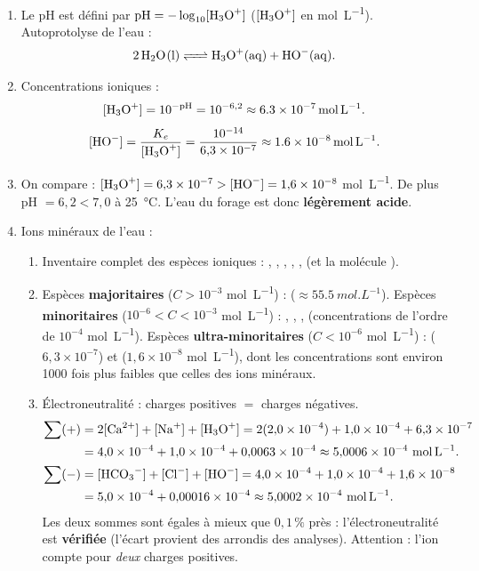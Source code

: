 \documentclass[11pt]{article}
\begin{document}
\begin{corrige}
\begin{enumerate}
\item Le pH est défini par $\mathrm{pH} = -\log_{10}[\ce{H3O+}]$ ($[\ce{H3O+}]$ en \si{mol.L^{-1}}). Autoprotolyse de l'eau :
\[ \ce{2 H2O(l) <=> H3O+(aq) + HO-(aq)}. \]
\item Concentrations ioniques :
\[ [\ce{H3O+}] = 10^{-\mathrm{pH}} = 10^{-6{,}2} \approx \SI{6,3e-7}{mol.L^{-1}}. \]
\[ [\ce{HO-}] = \frac{K_e}{[\ce{H3O+}]} = \frac{10^{-14}}{6{,}3\times10^{-7}} \approx \SI{1,6e-8}{mol.L^{-1}}. \]
\item On compare : $[\ce{H3O+}] = 6{,}3\times10^{-7} > [\ce{HO-}] = 1{,}6\times10^{-8}$ \si{mol.L^{-1}}. De plus pH $= 6{,}2 < 7{,}0$ à \SI{25}{\celsius}. L'eau du forage est donc \textbf{légèrement acide}.
\item Ions minéraux de l'eau :
\begin{enumerate}
\item Inventaire complet des espèces ioniques : , , , , ,  (et la molécule ).
\item Espèces \textbf{majoritaires} ($C > 10^{-3}$ \si{mol.L^{-1}}) :  ($\approx \SI{55,5}{mol.L^{-1}}$). Espèces \textbf{minoritaires} ($10^{-6} < C < 10^{-3}$ \si{mol.L^{-1}}) : , , ,  (concentrations de l'ordre de $10^{-4}$ \si{mol.L^{-1}}). Espèces \textbf{ultra-minoritaires} ($C < 10^{-6}$ \si{mol.L^{-1}}) :  ($6{,}3\times10^{-7}$) et  ($1{,}6\times10^{-8}$ \si{mol.L^{-1}}), dont les concentrations sont environ 1000 fois plus faibles que celles des ions minéraux.
\item Électroneutralité : charges positives $=$ charges négatives.
\begin{align*}
\sum (+) &= 2[\ce{Ca^2+}] + [\ce{Na+}] + [\ce{H3O+}] = 2(2{,}0\times10^{-4}) + 1{,}0\times10^{-4} + 6{,}3\times10^{-7}\\
&= 4{,}0\times10^{-4} + 1{,}0\times10^{-4} + 0{,}0063\times10^{-4} \approx 5{,}0006\times10^{-4}\ \si{mol.L^{-1}}.\\
\sum (-) &= [\ce{HCO3-}] + [\ce{Cl-}] + [\ce{HO-}] = 4{,}0\times10^{-4} + 1{,}0\times10^{-4} + 1{,}6\times10^{-8}\\
&= 5{,}0\times10^{-4} + 0{,}00016\times10^{-4} \approx 5{,}0002\times10^{-4}\ \si{mol.L^{-1}}.
\end{align*}
Les deux sommes sont égales à mieux que $0{,}1\,\%$ près : l'électroneutralité est \textbf{vérifiée} (l'écart provient des arrondis des analyses). Attention : l'ion  compte pour \emph{deux} charges positives.

\end{enumerate}
\end{enumerate}
\end{corrige}
\end{document}
